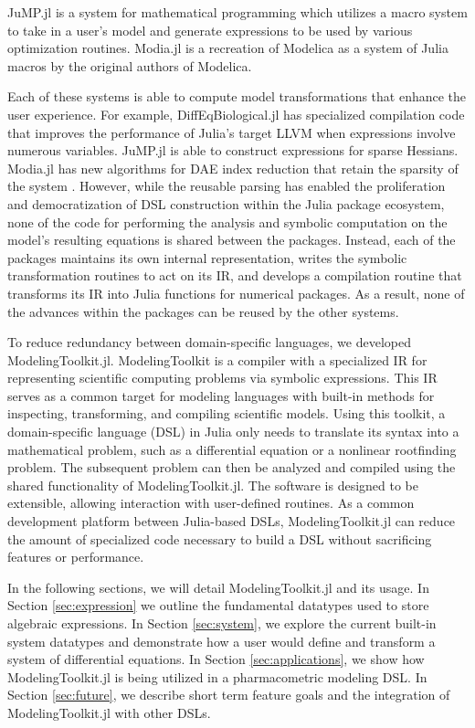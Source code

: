 \documentclass{juliacon}
\begin{document}
JuMP.jl \cite{DunningHuchetteLubin2017} is a system for mathematical programming which utilizes a macro system to take in a user's model and generate expressions to be used by various optimization routines. Modia.jl \cite{elmqvist2016systems} is a recreation of Modelica as a system of Julia macros by the original authors of Modelica.

Each of these systems is able to compute model transformations that enhance the user experience. For example, DiffEqBiological.jl has specialized compilation code that improves the performance of Julia's target LLVM when expressions involve numerous variables. JuMP.jl is able to construct expressions for sparse Hessians. Modia.jl has new algorithms for DAE index reduction that retain the sparsity of the system \cite{Otter2017TransformationOD}. However, while the reusable parsing has enabled the proliferation and democratization of DSL construction within the Julia package ecosystem, none of the code for performing the analysis and symbolic computation on the model's resulting equations is shared between the packages. Instead, each of the packages maintains its own internal representation, writes the symbolic transformation routines to act on its IR, and develops a compilation routine that transforms its IR into Julia functions for numerical packages. As a result, none of the advances within the packages can be reused by the other systems. 

To reduce redundancy between domain-specific languages, we developed ModelingToolkit.jl. ModelingToolkit is a compiler with a specialized IR for representing scientific computing problems via symbolic expressions. This IR serves as a common target for modeling languages with built-in methods for inspecting, transforming, and compiling scientific models. Using this toolkit, a domain-specific language (DSL) in Julia only needs to translate its syntax into a mathematical problem, such as a differential equation or a nonlinear rootfinding problem. The subsequent problem can then be analyzed and compiled using the shared functionality of ModelingToolkit.jl. The software is designed to be extensible, allowing interaction with user-defined routines. As a common development platform between Julia-based DSLs, ModelingToolkit.jl can reduce the amount of specialized code necessary to build a DSL without sacrificing features or performance.

In the following sections, we will detail ModelingToolkit.jl and its usage. In Section \ref{sec:expression} we outline the fundamental datatypes used to store algebraic expressions. In Section \ref{sec:system}, we explore the current built-in system datatypes and demonstrate how a user would define and transform a system of differential equations. In Section \ref{sec:applications}, we show how ModelingToolkit.jl is being utilized in a pharmacometric modeling DSL. In Section \ref{sec:future}, we describe short term feature goals and the integration of ModelingToolkit.jl with other DSLs.
\end{document}
